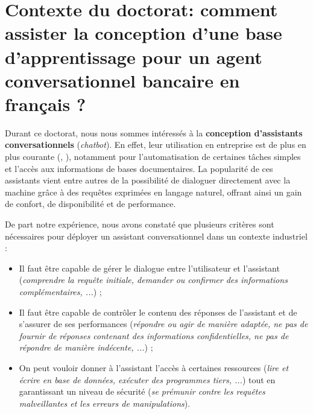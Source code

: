 \section{Contexte du doctorat: comment assister la conception d'une base d'apprentissage pour un agent conversationnel bancaire en français ?}
\label{section:2.4-CONTEXTE-DOCTORAT}

	Durant ce doctorat, nous nous sommes intéressés à la \textbf{conception d'assistants conversationnels} (\textit{chatbot}).
	En effet, leur utilisation en entreprise est de plus en plus courante (\cite{goasduff:2019:chatbots-will-appeal}, \cite{costello-lodolce:2022:gartner-predicts-chatbots}), notamment pour l'automatisation de certaines tâches simples et l'accès aux informations de bases documentaires.
	La popularité de ces assistants vient entre autres de la possibilité de dialoguer directement avec la machine grâce à des requêtes exprimées en langage naturel, offrant ainsi un gain de confort, de disponibilité et de performance.
	
	De part notre expérience, nous avons constaté que plusieurs critères sont nécessaires pour déployer un assistant conversationnel dans un contexte industriel :
	\begin{itemize}
		\item Il faut être capable de gérer le dialogue entre l'utilisateur et l'assistant (\textit{comprendre la requête initiale, demander ou confirmer des informations complémentaires, ...}) ;
		\item Il faut être capable de contrôler le contenu des réponses de l'assistant et de s'assurer de ses performances (\textit{répondre ou agir de manière adaptée, ne pas de fournir de réponses contenant des informations confidentielles, ne pas de répondre de manière indécente, ...}) ;
		\item On peut vouloir donner à l'assistant l'accès à certaines ressources (\textit{lire et écrire en base de données, exécuter des programmes tiers, ...}) tout en garantissant un niveau de sécurité (\textit{se prémunir contre les requêtes malveillantes et les erreurs de manipulations}).
	\end{itemize}
	
